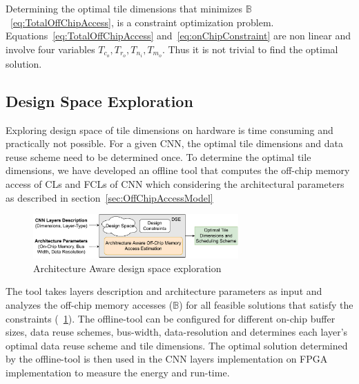 \documentclass[a4paper,10pt]{article}
\newcommand{\numBytesOffChip}{\mathbb{B}}
\begin{document}
Determining the optimal tile dimensions that minimizes $\numBytesOffChip$~\eqref{eq:TotalOffChipAccess}, is a constraint optimization problem. Equations~\eqref{eq:TotalOffChipAccess} and~\eqref{eq:onChipConstraint} are non linear and involve four variables $T_{c_o},T_{r_o},T_{n_i},T_{m_o}$. Thus it is not trivial to find the optimal solution.
\subsection{Design Space Exploration}
Exploring design space of tile dimensions on hardware is time consuming and practically not possible. For a given CNN, the optimal tile dimensions and data reuse scheme need to be determined once. To determine the optimal tile dimensions, we have developed an offline tool that computes the off-chip memory access of CLs and FCLs of CNN which considering the architectural parameters as described in section~\ref{sec:OffChipAccessModel}
\begin{figure}[!htb]
	\centering
	\includegraphics[width=0.7\textwidth]{offlineFrameworkForCNN}
	\caption{Architecture Aware design space exploration}
	\label{fig:offlineFrameworkForCNN}
\end{figure}
The tool takes layers description and architecture parameters as input and analyzes the off-chip memory accesses ($\numBytesOffChip$) for all feasible solutions that satisfy the constraints (\figurename~\ref{fig:offlineFrameworkForCNN}). The offline-tool can be configured for different on-chip buffer sizes, data reuse schemes, bus-width, data-resolution and determines each layer's optimal data reuse scheme and tile dimensions. The optimal solution determined by the offline-tool is then used in the CNN layers implementation on FPGA implementation to measure the energy and run-time. 
\end{document}
